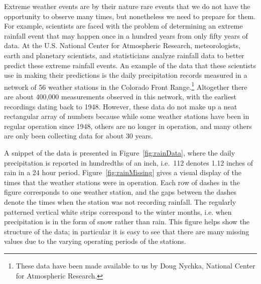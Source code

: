 Extreme weather events are by their nature rare events that we do not
have the opportunity to observe many times, but nonetheless we need to
prepare for them.  For example, scientists are faced with the problem
of determining an extreme rainfall event that may happen once in a
hundred years from only fifty years of data.  At the U.S. National
Center for Atmospheric Research, meteorologists, earth and planetary
scientists, and statisticians analyze rainfall data to better predict
these extreme rainfall events.  An example of the data that these
scientists use in making their predictions is the daily precipitation
records measured in a network of 56 weather stations in the Colorado
Front Range.\footnote{These data  have been made
 available to us by Doug Nychka, National Center for Atmospheric
  Research.}  Altogether there are about 400,000 measurements observed
in this network, with the earliest recordings dating back to 1948.
However, these data do not make up a neat rectangular array of numbers
because while some weather stations have been in regular operation
since 1948, others are no longer in operation, and many others are
only been collecting data for about 30 years.

A snippet of the data is presented in Figure~\ref{fig:rainData}, where
the daily precipitation is reported in hundredths of an inch, i.e.\
112 denotes 1.12 inches of rain in a 24 hour period.
Figure~\ref{fig:rainMissing} gives a visual display of the times that
the weather stations were in operation.  Each row of dashes in the
figure corresponds to one weather station, and the gaps between the
dashes denote the times when the station was not recording rainfall.
The regularly patterned vertical white strips correspond to the winter
months, i.e. when precipitation is in the form of snow rather than
rain. This figure helps show the structure of the data; in particular
it is easy to see that there are many missing values due to the
varying operating periods of the stations.


